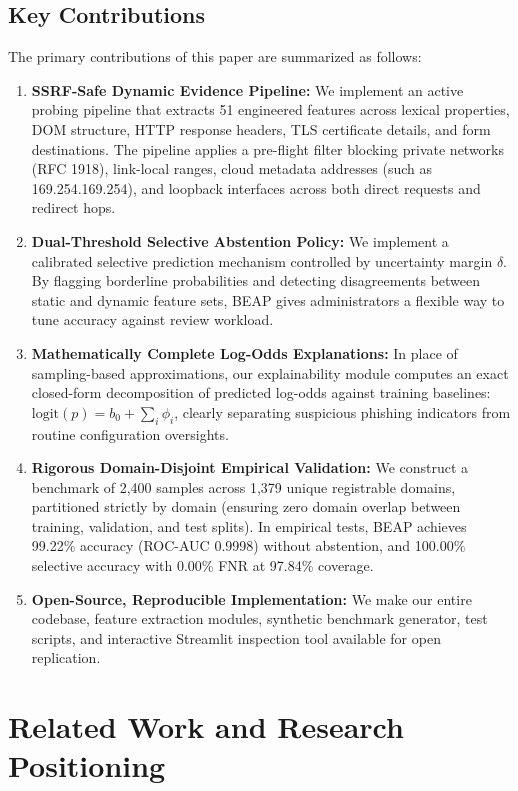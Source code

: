 \documentclass[conference]{IEEEtran}
\begin{document}
\subsection{Key Contributions}\label{contributions}

The primary contributions of this paper are summarized as follows:
\begin{enumerate}[leftmargin=2.5em]
    \item \textbf{SSRF-Safe Dynamic Evidence Pipeline:} We implement an active probing pipeline that extracts 51 engineered features across lexical properties, DOM structure, HTTP response headers, TLS certificate details, and form destinations. The pipeline applies a pre-flight filter blocking private networks (RFC 1918), link-local ranges, cloud metadata addresses (such as 169.254.169.254), and loopback interfaces across both direct requests and redirect hops.
    \item \textbf{Dual-Threshold Selective Abstention Policy:} We implement a calibrated selective prediction mechanism controlled by uncertainty margin $\delta$. By flagging borderline probabilities and detecting disagreements between static and dynamic feature sets, BEAP gives administrators a flexible way to tune accuracy against review workload.
    \item \textbf{Mathematically Complete Log-Odds Explanations:} In place of sampling-based approximations, our explainability module computes an exact closed-form decomposition of predicted log-odds against training baselines: $\text{logit}(p) = b_0 + \sum_{i} \phi_i$, clearly separating suspicious phishing indicators from routine configuration oversights.
    \item \textbf{Rigorous Domain-Disjoint Empirical Validation:} We construct a benchmark of 2,400 samples across 1,379 unique registrable domains, partitioned strictly by domain (ensuring zero domain overlap between training, validation, and test splits). In empirical tests, BEAP achieves 99.22\% accuracy (ROC-AUC 0.9998) without abstention, and 100.00\% selective accuracy with 0.00\% FNR at 97.84\% coverage.
    \item \textbf{Open-Source, Reproducible Implementation:} We make our entire codebase, feature extraction modules, synthetic benchmark generator, test scripts, and interactive Streamlit inspection tool available for open replication.
\end{enumerate}

\section{Related Work and Research Positioning}\label{related-work-and-research-positioning}
\end{document}
